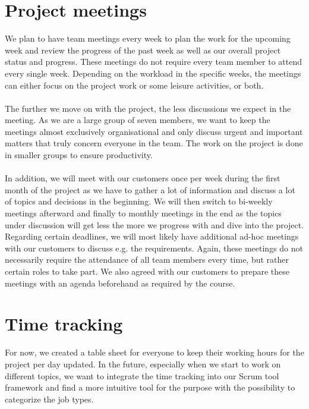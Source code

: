 \section{Project meetings}\label{sec:meetings}

We plan to have team meetings every week to plan the work for the upcoming week and review the progress of the past week as well as our overall project status and progress. These meetings do not require every team member to attend every single week. Depending on the workload in the specific weeks, the meetings can either focus on the project work or some leisure activities, or both.
\\\\
The further we move on with the project, the less discussions we expect in the meeting. As we are a large group of seven members, we want to keep the meetings almost exclusively organisational and only discuss urgent and important matters that truly concern everyone in the team. The work on the project is done in smaller groups to ensure productivity.
\\\\
In addition, we will meet with our customers once per week during the first month of the project as we have to gather a lot of information and discuss a lot of topics and decisions in the beginning. We will then switch to bi-weekly meetings afterward and finally to monthly meetings in the end as the topics under discussion will get less the more we progress with and dive into the project. Regarding certain deadlines, we will most likely have additional ad-hoc meetings with our customers to discuss e.g. the requirements. Again, these meetings do not necessarily require the attendance of all team members every time, but rather certain roles to take part. We also agreed with our customers to prepare these meetings with an agenda beforehand as required by the course.

\section{Time tracking}\label{sec:time-tracking}

For now, we created a table sheet for everyone to keep their working hours for the project per day updated. In the future, especially when we start to work on different topics, we want to integrate the time tracking into our Scrum tool framework and find a more intuitive tool for the purpose with the possibility to categorize the job types.
